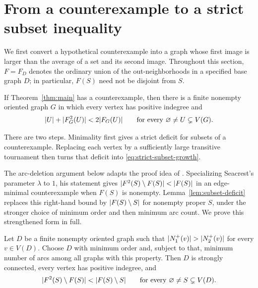 \section{From a counterexample to a strict subset inequality}
\label{sec:reduction}

We first convert a hypothetical counterexample into a graph whose first
image is larger than the average of a set and its second image.  Throughout
this section, $F=F_D$ denotes the ordinary union of the out-neighborhoods
in a specified base graph $D$; in particular, $F(S)$ need not be disjoint
from $S$.

\begin{proposition}
\label{prop:counterexample-reduction}
If Theorem~\ref{thm:main} has a counterexample, then there is a finite
nonempty oriented graph $G$ in which every vertex has positive indegree
and
\begin{equation}
\label{eq:strict-subset-growth}
  \lvert U\rvert+\lvert F_G^2(U)\rvert<2\lvert F_G(U)\rvert
  \qquad\text{for every }\varnothing\ne U\subsetneq V(G).
\end{equation}
\end{proposition}

There are two steps.  Minimality first gives a strict deficit for subsets
of a counterexample.  Replacing each vertex by a sufficiently large
transitive tournament then turns that deficit into
\eqref{eq:strict-subset-growth}.

The arc-deletion argument below adapts the proof idea of
\cite[Lemma~4]{Seacrest2019}.  Specializing Seacrest's parameter $\lambda$
to $1$, his statement gives
$\lvert F^2(S)\setminus F(S)\rvert<\lvert F(S)\rvert$ in an edge-minimal
counterexample when $F(S)$ is nonempty.  Lemma~\ref{lem:subset-deficit}
replaces this right-hand bound by $\lvert F(S)\setminus S\rvert$ for nonempty
proper $S$, under the stronger choice of minimum order and then minimum
arc count.  We prove this strengthened form in full.

\begin{lemma}
\label{lem:subset-deficit}
Let $D$ be a finite nonempty oriented graph such that
$\lvert N_1^+(v)\rvert>\lvert N_2^+(v)\rvert$ for every $v\in V(D)$.
Choose $D$ with minimum order and, subject to that, minimum number of
arcs among all graphs with this property.  Then $D$ is strongly connected,
every vertex has positive indegree, and
\begin{equation}
\label{eq:subset-deficit}
  \lvert F^2(S)\setminus F(S)\rvert<\lvert F(S)\setminus S\rvert
  \qquad\text{for every }\varnothing\ne S\subsetneq V(D).
\end{equation}
\end{lemma}


